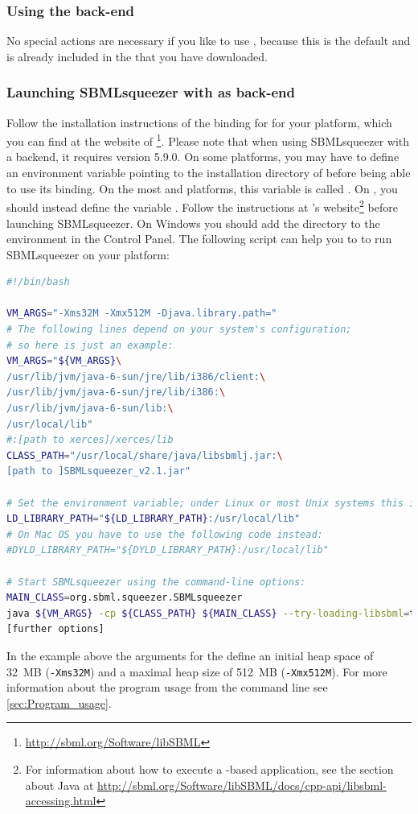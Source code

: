\subsubsection{Using the \JSBML back-end}

No special actions are necessary if you like to use \JSBML, because this is the
default and \JSBML is already included in the \JAR that you have downloaded.

\subsubsection{Launching SBMLsqueezer with \libSBML as back-end}
\label{sec:UsingLibSBML}
Follow the installation instructions of the \Java binding for \libSBML for your
platform, which you can find at the website of
\libSBML\footnote{\url{http://sbml.org/Software/libSBML}}.
Please note that when using SBMLsqueezer with a \libSBML backend, it requires \libSBML version 5.9.0.
On some platforms, you may have to define an environment variable pointing
to the installation directory of \libSBML before being able to use its \Java
binding.
On the most \Unix and \Linux platforms, this variable is called
\LDLIBRARYPATH.
On \MacOSX, you should instead define the variable \DYLDLIBRARYPATH.
Follow the instructions at \libSBML's website\footnote{For information about how to execute a \libSBML-based \Java application, see the section about Java at \href{http://sbml.org/Software/libSBML/docs/cpp-api/libsbml-accessing.html}{\url{http://sbml.org/Software/libSBML/docs/cpp-api/libsbml-accessing.html}}} %
before launching SBMLsqueezer.
On Windows you should add the \libSBML directory to the \PATH environment in the Control Panel.
The following script can help you to to run SBMLsqueezer on your \Unix platform:
\begin{lstlisting}[language=bash, caption={Example Bash script that launches SBMLsqueezer with a \libSBML back-end}]
#!/bin/bash

VM_ARGS="-Xms32M -Xmx512M -Djava.library.path="
# The following lines depend on your system's configuration;
# so here is just an example:
VM_ARGS="${VM_ARGS}\
/usr/lib/jvm/java-6-sun/jre/lib/i386/client:\
/usr/lib/jvm/java-6-sun/jre/lib/i386:\
/usr/lib/jvm/java-6-sun/lib:\
/usr/local/lib"
#:[path to xerces]/xerces/lib
CLASS_PATH="/usr/local/share/java/libsbmlj.jar:\
[path to ]SBMLsqueezer_v2.1.jar"

# Set the environment variable; under Linux or most Unix systems this is
LD_LIBRARY_PATH="${LD_LIBRARY_PATH}:/usr/local/lib"
# On Mac OS you have to use the following code instead:
#DYLD_LIBRARY_PATH="${DYLD_LIBRARY_PATH}:/usr/local/lib"

# Start SBMLsqueezer using the command-line options:
MAIN_CLASS=org.sbml.squeezer.SBMLsqueezer 
java ${VM_ARGS} -cp ${CLASS_PATH} ${MAIN_CLASS} --try-loading-libsbml=true\
[further options]
\end{lstlisting}
In the example above the arguments for the \JVM define an initial heap space of
32~MB (\texttt{-Xms32M}) and a maximal heap size of 512~MB (\texttt{-Xmx512M}).
For more information about the program usage from the command line see \vref{sec:Program_usage}.


